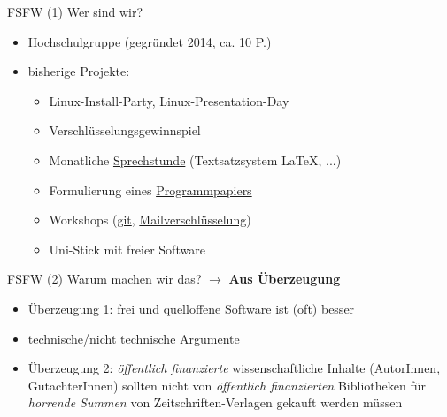 \documentclass[t]{beamer}
\begin{document}
\begin{frame}[label=ct1]{\color{fg}FSFW (1)}
Wer sind wir?
  \begin{itemize}
  \item Hochschulgruppe (gegründet 2014, ca. 10 P.)
  \item bisherige Projekte:
  \begin{itemize}
   \item Linux-Install-Party, Linux-Presentation-Day
   \item Verschlüsselungsgewinnspiel
   \item Monatliche \href{https://fsfw-dresden.de/sprechstunde}{Sprechstunde} (Textsatzsystem \LaTeX, ...)
   \item Formulierung eines \href{https://fsfw-dresden.de/programm}{Programmpapiers}
   \item Workshops (\href{https://fsfw-dresden.de/git-ws}{git}, \href{https://fsfw-dresden.de/gpg}{Mailverschlüsselung})
   \item Uni-Stick mit freier Software
  \end{itemize}
  \end{itemize}  
\end{frame}


\begin{frame}[label=ct2]{\color{fg}FSFW (2)}
Warum machen wir das? $\rightarrow$ \textbf{Aus Überzeugung}\\[1cm]
  \begin{itemize}
  \item Überzeugung 1: frei und quelloffene Software ist (oft) besser
  \item[] technische/nicht technische Argumente
  \pause
  \bigskip
  \item Überzeugung 2: \textit{öffentlich finanzierte} wissenschaftliche Inhalte
  (AutorInnen, GutachterInnen) sollten nicht von \textit{öffentlich finanzierten}
  Bibliotheken für \textit{horrende Summen} von Zeitschriften-Verlagen gekauft werden müssen
  \end{itemize}  
\end{frame}
\end{document}
